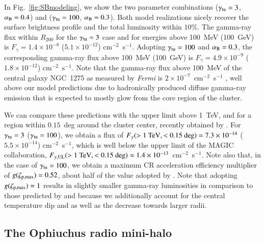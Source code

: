\documentclass[useAMS,usenatbib]{mn2e}
\begin{document}
In Fig.~\ref{fig:SBmodeling}, we show the two parameter combinations
($\gamma_{{\mathrm{tu}}}=3$, $\alpha_{{\mathrm{B}}}=0.4$) and ($\gamma_{{\mathrm{tu}}}=100$,
$\alpha_{{\mathrm{B}}}=0.3$). Both model realizations nicely recover the surface
brightness profile and the total luminosity within $10\%$.  The gamma-ray flux
within $R_{200}$ for the $\gamma_{{\mathrm{tu}}}=3$ case and for energies above
100~MeV (100~GeV) is $F_{\gamma} = 1.4 \times 10^{-8}$ ($5.1 \times 10^{-12}$)
cm$^{-2}$~s$^{-1}$. Adopting $\gamma_{{\mathrm{tu}}}=100$ and $ \alpha_{{\mathrm{B}}}=0.3$, the
corresponding gamma-ray flux above 100~MeV (100~GeV) is $F_{\gamma} = 4.9 \times
10^{-9}$ ($1.8 \times 10^{-12}$) cm$^{-2}$~s$^{-1}$. Note that the gamma-ray
flux above 100~MeV of the central galaxy NGC~1275 as measured by \emph{Fermi} is
$2 \times 10^{-7}$~cm$^{-2}$~s$^{-1}$ \citep{2009arXiv0904.1904T}, well above
our model predictions due to hadronically produced diffuse gamma-ray emission
that is expected to mostly glow from the core region of the cluster.

We can compare these predictions with the upper limit above 1~TeV, and for a
region within $0.15$~deg around the cluster center, recently obtained by
\cite{2011arXiv1111.5544M}. For $\gamma_{{\mathrm{tu}}}=3$ ($\gamma_{{\mathrm{tu}}}=100$),
we obtain a flux of $F_{\gamma}(>1~{\mathrm{TeV}},<0.15~{\mathrm{deg}}) = 7.3 \times
10^{-14}$ ($5.5 \times 10^{-14}$) cm$^{-2}$~s$^{-1}$, which is well below the
upper limit of the MAGIC collaboration,
$F_{\gamma,{\mathrm{UL}}}(>1~{\mathrm{TeV}},<0.15~{\mathrm{deg}}) \approx 1.4 \times
10^{-13}$~cm$^{-2}$~s$^{-1}$. Note also that, in the case of $\gamma_{{\mathrm{tu}}}
= 100$, we obtain a maximum CR acceleration efficiency multiplier of
$g(\zeta_{{\mathrm{p,max}}})=0.52$, about half of the value adopted by
\cite{2010MNRAS.409..449P}. Note that adopting $g(\zeta_{{\mathrm{p,max}}})=1$
results in slightly smaller gamma-ray luminosities in comparison to those
predicted by \cite{2010MNRAS.409..449P} and \cite{2011arXiv1105.3240P} because
we additionally account for the central temperature dip and as well as the
decrease towards larger radii.


\subsection{The Ophiuchus radio mini-halo}
\end{document}
